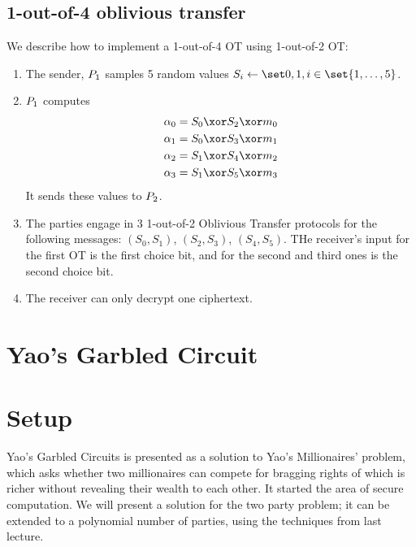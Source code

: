 \subsection{1-out-of-4 oblivious transfer}
  We describe how to implement a 1-out-of-4 OT using 1-out-of-2 OT:\@
  \begin{enumerate}
    \item
      The sender, $P_1$ samples 5 random values $S_i \gets \bits, i \in \set{1,\dotsc, 5}$.
    \item
      $P_1$ computes
      \begin{align*}
        \alpha_0 &= S_0 \xor S_2 \xor m_0\\
        \alpha_1 &= S_0 \xor S_3 \xor m_1\\
        \alpha_2 &= S_1 \xor S_4 \xor m_2\\
        \alpha_3 &= S_1 \xor S_5 \xor m_3
      \end{align*}
      It sends these values to $P_2$.
    \item
      The parties engage in 3 1-out-of-2 Oblivious Transfer protocols for the following
      messages: $(S_0, S_1)$, $(S_2, S_3)$, $(S_4, S_5)$. THe receiver's input for
      the first OT is the first choice bit, and for the second and third ones is
      the second choice bit.
    \item
      The receiver can only decrypt one ciphertext.
  \end{enumerate}


\section{Yao's Garbled Circuit}


%

\section{Setup}


Yao's Garbled Circuits is presented as a solution to Yao's Millionaires' problem, 
which asks whether 
two millionaires can compete for bragging rights of which is richer
without revealing their wealth to each other. 
It started the area of secure computation. 
We will present a solution for the two party problem;
it can be extended to a polynomial number of parties,
using the techniques from last lecture.

